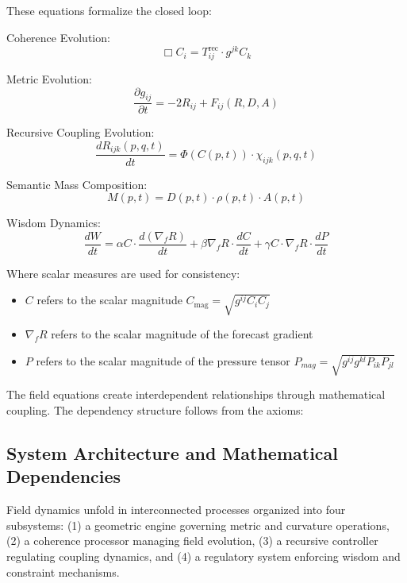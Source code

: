 These equations formalize the closed loop:

Coherence Evolution:
\begin{equation}
\Box C_i = T^{\text{rec}}_{ij} \cdot g^{jk} C_k
\end{equation}

Metric Evolution:
\begin{equation}
\frac{\partial g_{ij}}{\partial t} = -2 R_{ij} + F_{ij}(R, D, A)
\end{equation}

Recursive Coupling Evolution:
\begin{equation}
\frac{dR_{ijk}(p,q,t)}{dt} = \Phi(C(p,t)) \cdot \chi_{ijk}(p,q,t)
\end{equation}

Semantic Mass Composition:
\begin{equation}
M(p,t) = D(p,t) \cdot \rho(p,t) \cdot A(p,t)
\end{equation}

Wisdom Dynamics:
\begin{equation}
\frac{dW}{dt} = \alpha C \cdot \frac{d(\nabla_f R)}{dt} + \beta \nabla_f R \cdot \frac{dC}{dt} + \gamma C \cdot \nabla_f R \cdot \frac{dP}{dt}
\end{equation}

Where scalar measures are used for consistency:
\begin{itemize}
    \item \(C\) refers to the scalar magnitude \(C_{\mathrm{mag}} = \sqrt{g^{ij}C_i C_j}\)
    \item \(\nabla_f R\) refers to the scalar magnitude of the forecast gradient
    \item \(P\) refers to the scalar magnitude of the pressure tensor \(P_{mag} = \sqrt{g^{ij}g^{kl}P_{ik}P_{jl}}\)
\end{itemize}

The field equations create interdependent relationships through mathematical coupling. The dependency structure follows from the axioms:

\subsection{System Architecture and Mathematical Dependencies}

Field dynamics unfold in interconnected processes organized into four subsystems: (1) a geometric engine governing metric and curvature operations, (2) a coherence processor managing field evolution, (3) a recursive controller regulating coupling dynamics, and (4) a regulatory system enforcing wisdom and constraint mechanisms.

